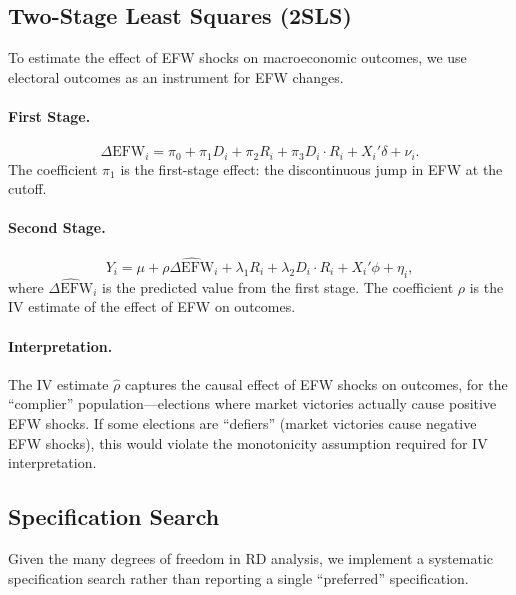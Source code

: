 \documentclass[12pt,a4paper]{article}
\newcommand{\efw}{\text{EFW}}
\begin{document}
\subsection{Two-Stage Least Squares (2SLS)}

To estimate the effect of EFW shocks on macroeconomic outcomes, we use 
electoral outcomes as an instrument for EFW changes.

\paragraph{First Stage.}
\begin{equation}
    \Delta \efw_i = \pi_0 + \pi_1 D_i + \pi_2 R_i + \pi_3 D_i \cdot R_i + 
    X_i'\delta + \nu_i.
    \label{eq:first_stage}
\end{equation}
The coefficient $\pi_1$ is the first-stage effect: the discontinuous 
jump in EFW at the cutoff.

\paragraph{Second Stage.}
\begin{equation}
    Y_i = \mu + \rho \widehat{\Delta \efw}_i + \lambda_1 R_i + 
    \lambda_2 D_i \cdot R_i + X_i'\phi + \eta_i,
    \label{eq:second_stage}
\end{equation}
where $\widehat{\Delta \efw}_i$ is the predicted value from the first 
stage. The coefficient $\rho$ is the IV estimate of the effect of EFW 
on outcomes.

\paragraph{Interpretation.}
The IV estimate $\hat{\rho}$ captures the causal effect of EFW shocks 
on outcomes, for the ``complier'' population---elections where market 
victories actually cause positive EFW shocks. If some elections are 
``defiers'' (market victories cause negative EFW shocks), this would 
violate the monotonicity assumption required for IV interpretation.

\subsection{Specification Search}

Given the many degrees of freedom in RD analysis, we implement a 
systematic specification search rather than reporting a single 
``preferred'' specification.
\end{document}
